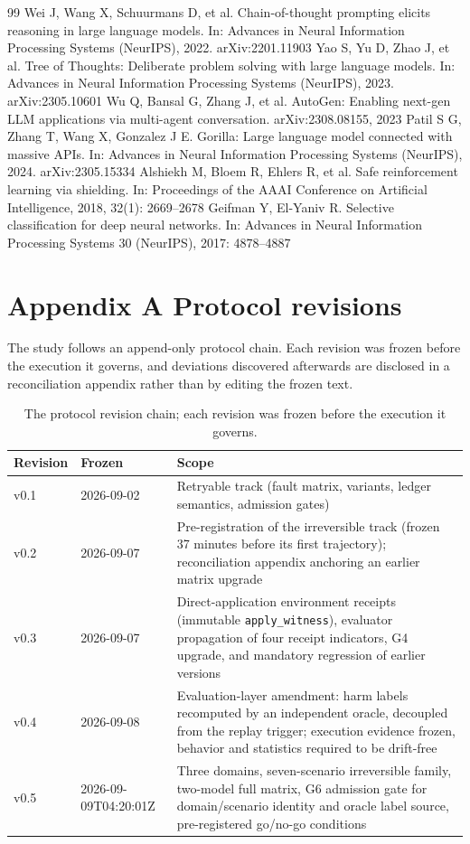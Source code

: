 \documentclass[review]{fcs}
\begin{document}
\begin{thebibliography}{99}
 Wei J, Wang X, Schuurmans D, et al. Chain-of-thought prompting elicits reasoning in large language models. In: Advances in Neural Information Processing Systems (NeurIPS), 2022. arXiv:2201.11903
 Yao S, Yu D, Zhao J, et al. Tree of Thoughts: Deliberate problem solving with large language models. In: Advances in Neural Information Processing Systems (NeurIPS), 2023. arXiv:2305.10601
 Wu Q, Bansal G, Zhang J, et al. AutoGen: Enabling next-gen LLM applications via multi-agent conversation. arXiv:2308.08155, 2023
 Patil S G, Zhang T, Wang X, Gonzalez J E. Gorilla: Large language model connected with massive APIs. In: Advances in Neural Information Processing Systems (NeurIPS), 2024. arXiv:2305.15334
 Alshiekh M, Bloem R, Ehlers R, et al. Safe reinforcement learning via shielding. In: Proceedings of the AAAI Conference on Artificial Intelligence, 2018, 32(1): 2669--2678
 Geifman Y, El-Yaniv R. Selective classification for deep neural networks. In: Advances in Neural Information Processing Systems 30 (NeurIPS), 2017: 4878--4887
\end{thebibliography}

\section*{Appendix A Protocol revisions}

The study follows an append-only protocol chain. Each revision was frozen before the execution it governs, and deviations discovered afterwards are disclosed in a reconciliation appendix rather than by editing the frozen text.

\begin{table}[t]
\centering
\caption{The protocol revision chain; each revision was frozen before the execution it governs.}
\label{tab:2}
\begin{tabular}{lll}
\toprule
Revision & Frozen & Scope \\
\midrule
v0.1 & 2026-09-02 & Retryable track (fault matrix, variants, ledger semantics, admission gates) \\
v0.2 & 2026-09-07 & Pre-registration of the irreversible track (frozen 37 minutes before its first trajectory); reconciliation appendix anchoring an earlier matrix upgrade \\
v0.3 & 2026-09-07 & Direct-application environment receipts (immutable \texttt{apply\_witness}), evaluator propagation of four receipt indicators, G4 upgrade, and mandatory regression of earlier versions \\
v0.4 & 2026-09-08 & Evaluation-layer amendment: harm labels recomputed by an independent oracle, decoupled from the replay trigger; execution evidence frozen, behavior and statistics required to be drift-free \\
v0.5 & 2026-09-09T04:20:01Z & Three domains, seven-scenario irreversible family, two-model full matrix, G6 admission gate for domain/scenario identity and oracle label source, pre-registered go/no-go conditions \\
\bottomrule
\end{tabular}
\end{table}
\end{document}
